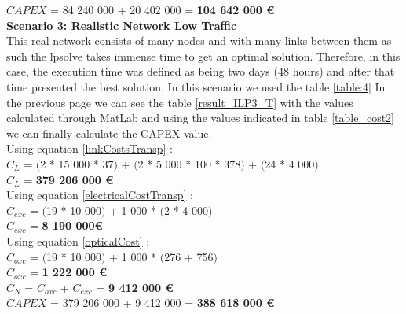 $CAPEX$ = 84 240 000 + 20 402 000 = \textbf{104 642 000 \euro}\\


\textbf{Scenario 3: Realistic Network Low Traffic} \label{Scenario3_transp} \\

This real network consists of many nodes and with many links between them as such the lpsolve takes immense time to get an optimal solution. Therefore, in this case, the execution time was defined as being two days (48 hours) and after that time presented the best solution. In this scenario we used the table \ref{table:4} In the previous page we can see the table \ref{result_ILP3_T} with the values calculated through MatLab and using the values indicated in table \ref{table_cost2} we can finally calculate the CAPEX value. \\

Using equation \ref{linkCostsTransp} : \\
$C_L$ = $($2 * 15 000 * 37$)$ + $($2 * 5 000 * 100 * 378$)$ + $($24 * 4 000$)$ \\
$C_L$ = \textbf{379 206 000 \euro} \\

Using equation \ref{electricalCostTransp} : \\
$C_{exc}$ = $($19 * 10 000$)$ + 1 000 * $($2 * 4 000$)$ \\
$C_{exc}$ = \textbf{8 190 000\euro} \\

Using equation \ref{opticalCost} : \\
$C_{oxc}$ = $($19 * 10 000$)$ + 1 000 * $($276 + 756$)$ \\
$C_{oxc}$ = \textbf{1 222 000 \euro} \\
$C_N$ = $C_{oxc}$ + $C_{exc}$ = \textbf{9 412 000 \euro} \\

$CAPEX$ = 379 206 000 + 9 412 000 = \textbf{388 618 000 \euro}\\

